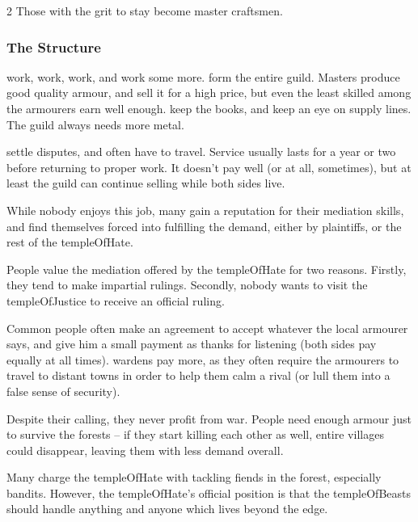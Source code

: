 \begin{multicols}{2}
Those with the grit to stay become master craftsmen.

\medbreak

\subsubsection{The Structure}

\begin{description}
  work, work, work, and work some more.
  form the entire guild.
  Masters produce good quality armour, and sell it for a high price, but even the least skilled among the armourers earn well enough.
  keep the books, and keep an eye on supply lines.
  The guild always needs more metal.
  \item[\Glspl{proctor}]
  settle disputes, and often have to travel.
  Service usually lasts for a year or two before returning to proper work.
  It doesn't pay well (or at all, sometimes), but at least the guild can continue selling while both sides live.

  While nobody enjoys this job, many gain a reputation for their mediation skills, and find themselves forced into fulfilling the demand, either by plaintiffs, or the rest of the \gls{templeOfHate}.
\end{description}

\noindent
People value the mediation offered by the \gls{templeOfHate} for two reasons.
Firstly, they tend to make impartial rulings.
Secondly, nobody wants to visit the \gls{templeOfJustice} to receive an official ruling.

Common people often make an agreement to accept whatever the local armourer says, and give him a small payment as thanks for listening (both sides pay equally at all times).
\Glspl{warden} pay more, as they often require the armourers to travel to distant towns in order to help them calm a rival (or lull them into a false sense of security).

Despite their calling, they never profit from war.
People need enough armour just to survive the forests -- if they start killing each other as well, entire \glspl{village} could disappear, leaving them with less demand overall.

Many charge the \gls{templeOfHate} with tackling \glspl{fiend} in the forest, especially bandits.
However, the \gls{templeOfHate}'s official position is that the \gls{templeOfBeasts} should handle anything and anyone which lives beyond the \gls{edge}.


\end{multicols}

